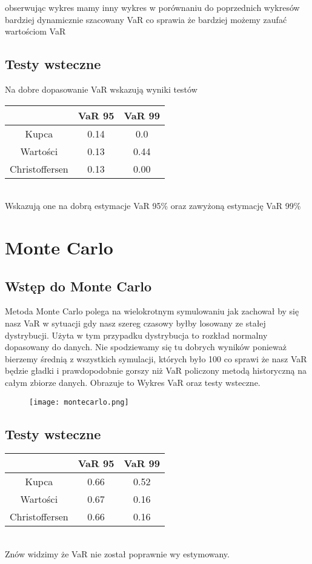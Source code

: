 \documentclass[]{article}
\begin{document}
	obserwując wykres mamy inny wykres w porównaniu do poprzednich wykresów bardziej dynamicznie szacowany VaR co sprawia że bardziej możemy zaufać wartościom VaR
	
	\subsection{Testy wsteczne}
	Na dobre dopasowanie VaR wskazują wyniki testów
		\\
	\begin{tabular}{|c|c|c|}
		\hline
		& VaR 95 & VaR 99 \\
		\hline
		Kupca & 0.14 & 0.0 \\
		\hline
		Wartości & 0.13 & 0.44 \\
		\hline
		Christoffersen &0.13 & 0.00 \\
		\hline
	\end{tabular}
	\\
	Wskazują one na dobrą estymacje VaR 95\% oraz zawyżoną estymację VaR 99\% 
	
\section{Monte Carlo}
	\subsection{Wstęp do Monte Carlo }
	Metoda Monte Carlo polega na wielokrotnym symulowaniu jak zachował by się nasz VaR w sytuacji gdy nasz szereg czasowy byłby losowany ze stałej dystrybucji. Użyta w tym przypadku dystrybucja to rozkład normalny dopasowany do danych. Nie spodziewamy się tu dobrych wyników ponieważ bierzemy średnią z wszystkich symulacji, których było 100 co sprawi że nasz VaR będzie gładki i prawdopodobnie gorszy niż VaR policzony metodą historyczną na całym zbiorze danych. Obrazuje to Wykres VaR oraz testy wsteczne. \\
	\begin{figure}[h!]
		\centering
		\texttt{[image: montecarlo.png]}
		\caption{}
		\label{fig:montecarlo}
	\end{figure}
	
	
	
	\subsection{Testy wsteczne}
		
	\begin{tabular}{|c|c|c|}
		\hline
		& VaR 95 & VaR 99 \\
		\hline
		Kupca & 0.66 & 0.52 \\
		\hline
		Wartości & 0.67 & 0.16 \\
		\hline
		Christoffersen &0.66 & 0.16 \\
		\hline
	\end{tabular}
	\\
	Znów widzimy że VaR nie został poprawnie wy estymowany. 
\end{document}
